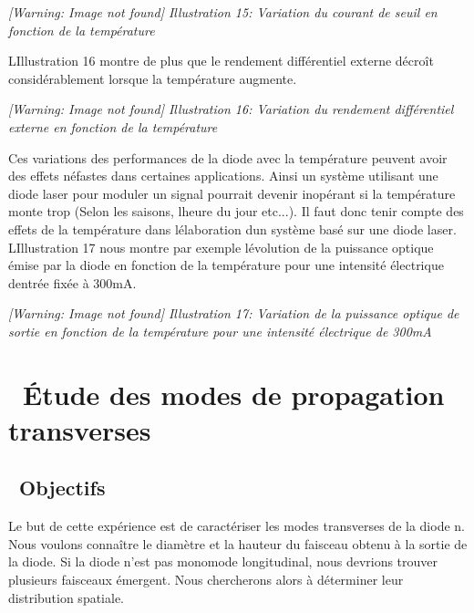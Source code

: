 \documentclass[12pt,twoside]{article}
\begin{document}
\begin{minipage}{15.334cm}
{\itshape
 [Warning: Image not found] Illustration
15\label{seq:refIllustration14}: Variation du courant de seuil en
fonction de la temp\'erature}
\end{minipage}

L{\textquotesingle}Illustration 16 montre de plus que le rendement
diff\'erentiel externe d\'ecro\^it consid\'erablement lorsque la
temp\'erature augmente.

\begin{minipage}{15.334cm}
{\itshape
 [Warning: Image not found] Illustration
16\label{seq:refIllustration15}: Variation du rendement diff\'erentiel
externe en fonction de la temp\'erature}
\end{minipage}

Ces variations des performances de la diode avec la temp\'erature
peuvent avoir des effets n\'efastes dans certaines applications. Ainsi
un syst\`eme utilisant une diode laser pour moduler un signal pourrait
devenir inop\'erant si la temp\'erature monte trop (Selon les saisons,
l{\textquotesingle}heure du jour etc...). Il faut donc tenir compte des
effets de la temp\'erature dans l{\textquotesingle}\'elaboration
d{\textquotesingle}un syst\`eme bas\'e sur une diode laser.
L{\textquotesingle}Illustration 17 nous montre par exemple
l{\textquotesingle}\'evolution de la puissance optique \'emise par la
diode en fonction de la temp\'erature pour une intensit\'e \'electrique
d{\textquotesingle}entr\'ee fix\'ee \`a 300mA.

\begin{minipage}{15.334cm}
{\itshape
 [Warning: Image not found] Illustration
17\label{seq:refIllustration16}: Variation de la puissance optique de
sortie en fonction de la temp\'erature pour une intensit\'e
\'electrique de 300mA}
\end{minipage}

\section[\ \'Etude des modes de propagation transverses]{\ \'Etude des
modes de propagation transverses}
\subsection[\ Objectifs]{\ Objectifs}
Le but de cette exp\'erience est de caract\'eriser les modes transverses
de la diode n{\textdegree}. Nous voulons conna\^itre le diam\`etre et
la hauteur du faisceau obtenu \`a la sortie de la diode. Si la diode
n'est pas monomode longitudinal, nous devrions trouver plusieurs
faisceaux \'emergent. Nous chercherons alors \`a d\'eterminer leur
distribution spatiale.
\end{document}
